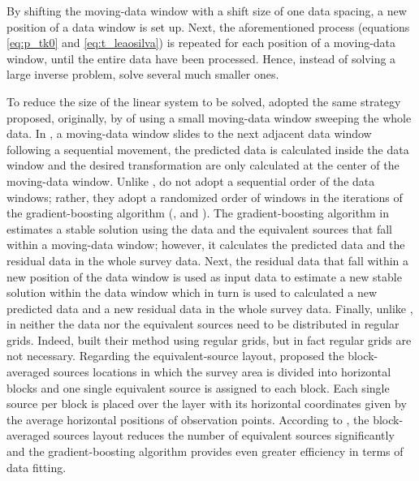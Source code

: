 By shifting the moving-data window with a shift size of one data spacing, 
a new position of a data window is set up.
Next, the aforementioned process (equations \ref{eq:p_tk0} and \ref{eq:t_leaosilva}) is repeated  for each position of a moving-data window, until the entire data have been processed.
Hence, instead of solving a large inverse problem, \cite{leao-silva1989} solve several much smaller ones. 


To reduce the size of the linear system to be solved, \cite{soler-uieda2021}  adopted the same strategy proposed, originally, by \cite{leao-silva1989}  of using a small moving-data window sweeping the whole data.
In \cite{leao-silva1989}, a moving-data window slides to the next adjacent data window following a sequential movement, the predicted data is calculated inside the data window and the desired transformation are only calculated at the center of the moving-data window.
Unlike \cite{leao-silva1989}, \cite{soler-uieda2021} do not adopt a sequential order of the data windows; rather, they adopt a randomized order of windows in the iterations of the gradient-boosting algorithm 
(\citeauthor{friedman2001}, \citeyear{friedman2001} and \citeyear{friedman2002}).
The  gradient-boosting algorithm in \cite{soler-uieda2021} estimates a stable solution using the data and the equivalent sources 
that fall within a moving-data window; however, it calculates the predicted data and the residual data in the whole survey data. 
Next, the residual data  that fall within a new position of the data window is used as input data to estimate a new stable solution within the data window
which in turn is used to calculated a new predicted data and 
a new residual data in the whole survey data.
Finally, unlike \cite{leao-silva1989}, in \cite{soler-uieda2021} neither the data nor the equivalent sources need to be distributed in regular grids.
Indeed, \cite{leao-silva1989} built their method using regular grids, but in fact regular grids are not necessary.
Regarding the equivalent-source layout, \cite{soler-uieda2021} proposed the block-averaged sources locations in which the survey area is divided into horizontal blocks and one single equivalent source is assigned to each block.
Each single source per block is placed over the layer with its horizontal coordinates given by the average horizontal positions of observation points.
According to \cite{soler-uieda2021}, the block-averaged sources layout reduces the number of equivalent sources significantly
and the gradient-boosting algorithm provides even greater efficiency in terms of data fitting.



